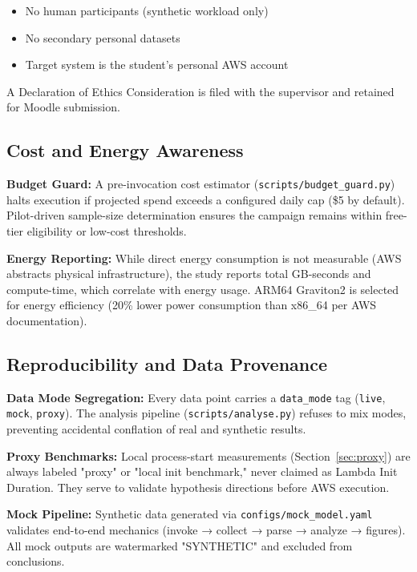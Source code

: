 \begin{itemize}
    \item No human participants (synthetic workload only)
    \item No secondary personal datasets
    \item Target system is the student's personal AWS account
\end{itemize}

A Declaration of Ethics Consideration is filed with the supervisor and retained for Moodle submission.

\subsection{Cost and Energy Awareness}

\textbf{Budget Guard:} A pre-invocation cost estimator (\texttt{scripts/budget\_guard.py}) halts execution if projected spend exceeds a configured daily cap (\$5 by default). Pilot-driven sample-size determination ensures the campaign remains within free-tier eligibility or low-cost thresholds.

\textbf{Energy Reporting:} While direct energy consumption is not measurable (AWS abstracts physical infrastructure), the study reports total GB-seconds and compute-time, which correlate with energy usage. ARM64 Graviton2 is selected for energy efficiency (20\% lower power consumption than x86\_64 per AWS documentation).

\subsection{Reproducibility and Data Provenance}

\textbf{Data Mode Segregation:} Every data point carries a \texttt{data\_mode} tag (\texttt{live}, \texttt{mock}, \texttt{proxy}). The analysis pipeline (\texttt{scripts/analyse.py}) refuses to mix modes, preventing accidental conflation of real and synthetic results.

\textbf{Proxy Benchmarks:} Local process-start measurements (Section~\ref{sec:proxy}) are always labeled "proxy" or "local init benchmark," never claimed as Lambda Init Duration. They serve to validate hypothesis directions before AWS execution.

\textbf{Mock Pipeline:} Synthetic data generated via \texttt{configs/mock\_model.yaml} validates end-to-end mechanics (invoke → collect → parse → analyze → figures). All mock outputs are watermarked "SYNTHETIC" and excluded from conclusions.

